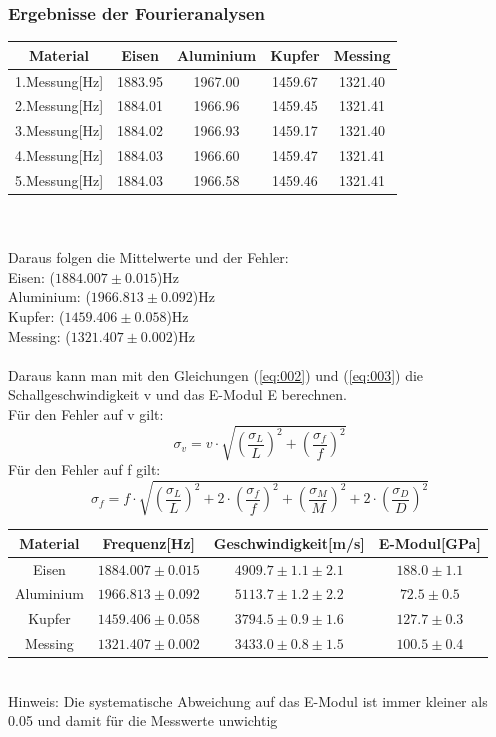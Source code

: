 \documentclass[12pt,a4paper]{article}
\begin{document}
\subsubsection{Ergebnisse der Fourieranalysen}
\begin{tabular}{|c|c|c|c|c|}
\hline 
Material & Eisen & Aluminium & Kupfer & Messing \\ 
\hline 
1.Messung[Hz] & 1883.95 & 1967.00 & 1459.67 & 1321.40 \\ 
\hline 
2.Messung[Hz] & 1884.01 & 1966.96 & 1459.45 & 1321.41 \\ 
\hline 
3.Messung[Hz] & 1884.02 & 1966.93 & 1459.17 & 1321.40 \\ 
\hline 
4.Messung[Hz] & 1884.03 & 1966.60 & 1459.47 & 1321.41 \\ 
\hline 
5.Messung[Hz] & 1884.03 & 1966.58 & 1459.46 & 1321.41 \\ 
\hline 
\end{tabular} 
\\
\\
Daraus folgen die Mittelwerte und der Fehler:\\
Eisen: 		($1884.007\pm0.015$)Hz\\
Aluminium:	($1966.813\pm0.092$)Hz\\
Kupfer:		($1459.406\pm0.058$)Hz\\
Messing:	($1321.407\pm0.002$)Hz\\
\\
Daraus kann man mit den Gleichungen (\ref{eq:002}) und (\ref{eq:003}) die Schallgeschwindigkeit v und das E-Modul E berechnen.\\
Für den Fehler auf v gilt:
\begin{equation}
\sigma_v= v\cdot\sqrt{(\frac{\sigma_L}{L})^2+(\frac{\sigma_f}{f})^2}
\end{equation}
Für den Fehler auf f gilt:
\begin{equation}
\sigma_f=f\cdot\sqrt{(\frac{\sigma_L}{L})^2+2\cdot(\frac{\sigma_f}{f})^2+(\frac{\sigma_M}{M})^2+2\cdot(\frac{\sigma_D}{D})^2}
\end{equation}
\begin{tabular}{|c|c|c|c|}
\hline 
Material  & Frequenz[Hz] & Geschwindigkeit[m/s] & E-Modul[GPa] \\ 
\hline 
Eisen & $1884.007\pm0.015$ & $4909.7\pm1.1\pm2.1$ & $188.0\pm1.1$ \\ 
\hline 
Aluminium & $1966.813\pm0.092$ & $5113.7\pm1.2\pm2.2$ & $72.5\pm0.5$ \\ 
\hline 
Kupfer & $1459.406\pm0.058$ & $3794.5\pm0.9\pm1.6$ & $127.7\pm0.3$ \\ 
\hline 
Messing & $1321.407\pm0.002$ & $3433.0\pm0.8\pm1.5$ & $100.5\pm0.4$ \\ 
\hline 
\end{tabular} 
\\
Hinweis: Die systematische Abweichung auf das E-Modul ist immer kleiner als 0.05 und damit für die Messwerte unwichtig
\newpage
\end{document}
